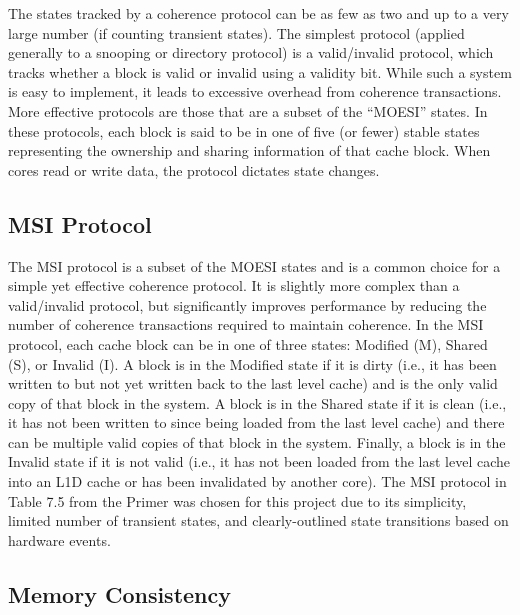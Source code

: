 \documentclass[10pt, compsoc]{IEEEtran}
\begin{document}
The states tracked by a coherence protocol can be as few as two and up to a very large number (if counting transient states). The simplest protocol (applied generally to a snooping or directory protocol) is a valid/invalid protocol, which tracks whether a block is valid or invalid using a validity bit. While such a system is easy to implement, it leads to excessive overhead from coherence transactions. More effective protocols are those that are a subset of the  ``MOESI'' states. In these protocols, each block is said to be in one of five (or fewer) stable states representing the ownership and sharing information of that cache block. When cores read or write data, the protocol dictates state changes. 



\subsection{MSI Protocol}

The MSI protocol is a subset of the MOESI states and is a common choice for a simple yet effective coherence protocol. It is slightly more complex than a valid/invalid protocol, but significantly improves performance by reducing the number of coherence transactions required to maintain coherence. In the MSI protocol, each cache block can be in one of three states: Modified (M), Shared (S), or Invalid (I). A block is in the Modified state if it is dirty (i.e., it has been written to but not yet written back to the last level cache) and is the only valid copy of that block in the system. A block is in the Shared state if it is clean (i.e., it has not been written to since being loaded from the last level cache) and there can be multiple valid copies of that block in the system. Finally, a block is in the Invalid state if it is not valid (i.e., it has not been loaded from the last level cache into an L1D cache or has been invalidated by another core). The MSI protocol in Table 7.5 from the Primer \cite{primer} was chosen for this project due to its simplicity, limited number of transient states, and clearly-outlined state transitions based on hardware events.  



\subsection{Memory Consistency}
\end{document}
